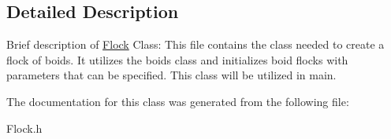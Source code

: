 \subsection{Detailed Description}
Brief description of \hyperlink{class_flock}{Flock} Class\+: This file contains the class needed to create a flock of boids. It utilizes the boids class and initializes boid flocks with parameters that can be specified. This class will be utilized in main. 

The documentation for this class was generated from the following file\+:\begin{DoxyCompactItemize}
\item 
Flock.\+h\end{DoxyCompactItemize}
